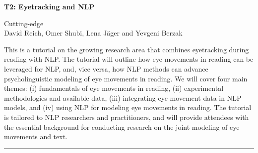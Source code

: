 \begin{center}
    \Large{\textbf{T2: Eyetracking and NLP}\\}
    \par\bigskip
    \large{Cutting-edge}\\
    \large{David Reich, Omer Shubi, Lena Jäger and Yevgeni Berzak}\\
    \par\bigskip

\end{center}

This is a tutorial on the growing research area that combines eyetracking during reading with NLP. The tutorial will outline how eye movements in reading can be leveraged for NLP, and, vice versa, how NLP methods can advance psycholinguistic modeling of eye movements in reading. We will cover four main themes: (i) fundamentals of eye movements in reading, (ii) experimental methodologies and available data, (iii) integrating eye movement data in NLP models, and (iv) using NLP for modeling eye movements in reading. The tutorial is tailored to NLP researchers and practitioners, and will provide attendees with the essential background for conducting research on the joint modeling of eye movements and text.

\begin{center}
    \noindent\rule{200px}{1pt}
\end{center}
